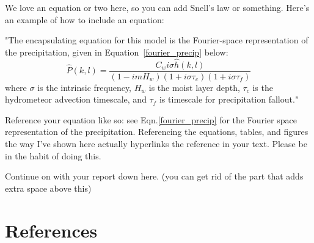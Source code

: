 \documentclass[12pt]{article}
\begin{document}
We love an equation or two here, so you can add Snell's law or something. Here's an example of how to include an equation:

"The encapsulating equation for this model is the Fourier-space representation of the precipitation, given in Equation~\ref{fourier_precip} below: 
\begin{equation}
\label{fourier_precip}
    \hat{P}(k,l) = \frac{C_w i \sigma \hat{h}(k,l)}{(1 - i m H_w)(1 + i \sigma \tau_c)(1 + i \sigma \tau_f)}
\end{equation}
where $\sigma$ is the intrinsic frequency, $H_w$ is the moist layer depth, $\tau_c$ is the hydrometeor advection timescale, and $\tau_f$ is timescale for precipitation fallout."

Reference your equation like so: see Eqn.\ref{fourier_precip} for the Fourier space representation of the precipitation. Referencing the equations, tables, and figures the way I've shown here actually hyperlinks the reference in your text. Please be in the habit of doing this. 

\vspace{18pt}
Continue on with your report down here. (you can get rid of the part that adds extra space above this)


\newpage
\section*{References}
\printbibliography[heading=none]
\end{document}
